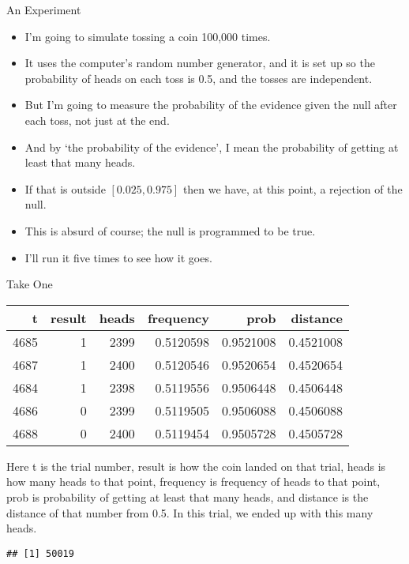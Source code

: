 \documentclass[
  ignorenonframetext,
]{beamer}
\providecommand{\tightlist}{%
  \setlength{\itemsep}{0pt}\setlength{\parskip}{0pt}}
\renewcommand{\,}{\text{, }}
\begin{document}
\begin{frame}{An Experiment}
\protect\hypertarget{an-experiment-1}{}

\begin{itemize}
\tightlist
\item
  I'm going to simulate tossing a coin 100,000 times.
\item
  It uses the computer's random number generator, and it is set up so
  the probability of heads on each toss is 0.5, and the tosses are
  independent.
\item
  But I'm going to measure the probability of the evidence given the
  null after each toss, not just at the end.
\item
  And by `the probability of the evidence', I mean the probability of
  getting at least that many heads.
\item
  If that is outside \([0.025, 0.975]\) then we have, at this point, a
  rejection of the null.
\item
  This is absurd of course; the null is programmed to be true.
\item
  I'll run it five times to see how it goes.
\end{itemize}

\end{frame}

\begin{frame}[fragile]{Take One}
\protect\hypertarget{take-one}{}

\begin{longtable}[]{@{}rrrrrr@{}}
\toprule
t & result & heads & frequency & prob & distance\tabularnewline
\midrule
\endhead
4685 & 1 & 2399 & 0.5120598 & 0.9521008 & 0.4521008\tabularnewline
4687 & 1 & 2400 & 0.5120546 & 0.9520654 & 0.4520654\tabularnewline
4684 & 1 & 2398 & 0.5119556 & 0.9506448 & 0.4506448\tabularnewline
4686 & 0 & 2399 & 0.5119505 & 0.9506088 & 0.4506088\tabularnewline
4688 & 0 & 2400 & 0.5119454 & 0.9505728 & 0.4505728\tabularnewline
\bottomrule
\end{longtable}

Here t is the trial number, result is how the coin landed on that trial,
heads is how many heads to that point, frequency is frequency of heads
to that point, prob is probability of getting at least that many heads,
and distance is the distance of that number from 0.5. In this trial, we
ended up with this many heads.

\begin{verbatim}
## [1] 50019
\end{verbatim}

\end{frame}
\end{document}
